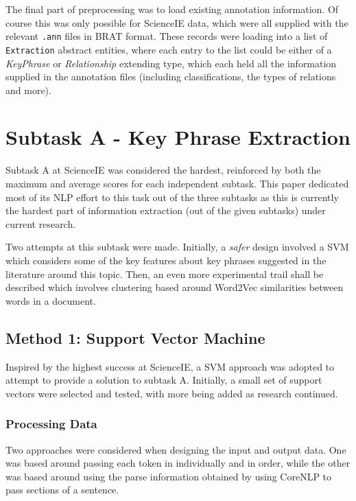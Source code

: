 The final part of preprocessing was to load existing annotation information. Of course this was only possible for ScienceIE data, which were all supplied with the relevant \texttt{.ann} files in BRAT format. These records were loading into a list of \texttt{Extraction} abstract entities, where each entry to the list could be either of a \textit{KeyPhrase} or \textit{Relationship} extending type, which each held all the information supplied in the annotation files (including classifications, the types of relations and more).

\section{Subtask A - Key Phrase Extraction}
Subtask A at ScienceIE was considered the hardest, reinforced by both the maximum and average scores for each independent subtask. This paper dedicated most of its NLP effort to this task out of the three subtasks as this is currently the hardest part of information extraction (out of the given subtasks) under current research. 

Two attempts at this subtask were made. Initially, a \textit{safer} design involved a SVM which considers some of the key features about key phrases suggested in the literature around this topic. Then, an even more experimental trail shall be described which involves clustering based around Word2Vec similarities between words in a document. 

\subsection{Method 1: Support Vector Machine}
Inspired by the highest success at ScienceIE, a SVM approach was adopted to attempt to provide a solution to subtask A. Initially, a small set of support vectors were selected and tested, with more being added as research continued.

\subsubsection*{Processing Data}
Two approaches were considered when designing the input and output data. One was based around passing each token in individually and in order, while the other was based around using the parse information obtained by using CoreNLP to pass sections of a sentence. 

